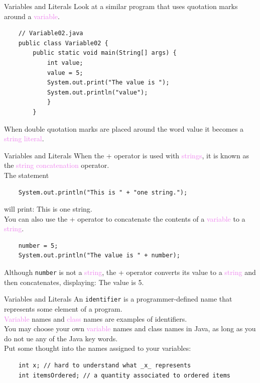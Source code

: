 \documentclass[11pt]{beamer}
\newcommand{\violet}[1]{\textcolor{violet}{#1}}
\begin{document}
\begin{frame}[fragile]{Variables and Literals}
    Look at a similar program that uses quotation marks around a \violet{variable}.
    \begin{lstlisting}
    // Variable02.java
    public class Variable02 {
        public static void main(String[] args) {
            int value;
            value = 5;
            System.out.print("The value is ");
            System.out.println("value");
            }
        }
    \end{lstlisting}
    When double quotation marks are placed around the word value it becomes a \violet{string literal}.
\end{frame}

\begin{frame}[fragile]{Variables and Literals}
    When the + operator is used with \violet{strings}, it is known as the \violet{string concatenation} operator. \\ \vspace{1em}
    The statement
    \begin{lstlisting}
    System.out.println("This is " + "one string.");
    \end{lstlisting}
    will print: This is one string. \\ \vspace{1em}
    You can also use the + operator to concatenate the contents of a \violet{variable} to a \violet{string}.
    \begin{lstlisting}
    number = 5;
    System.out.println("The value is " + number);
    \end{lstlisting}
    Although \texttt{number} is not a \violet{string}, the + operator converts its value to a \violet{string} and then concatenates, displaying: The value is 5.
\end{frame}

\begin{frame}[fragile]{Variables and Literals}
    An \texttt{identifier} is a programmer-defined name that represents some element of a program. \\ \vspace{1em}
    \violet{Variable} names and \violet{class} names are examples of identifiers. \\ \vspace{1em}
    You may choose your own \violet{variable} names and class names in Java, as long as you do not ue any of the Java key words. \\ \vspace{1em}
    Put some thought into the names assigned to your variables:
    \begin{lstlisting}
    int x; // hard to understand what _x_ represents
    int itemsOrdered; // a quantity associated to ordered items
    \end{lstlisting}
\end{frame}
\end{document}
